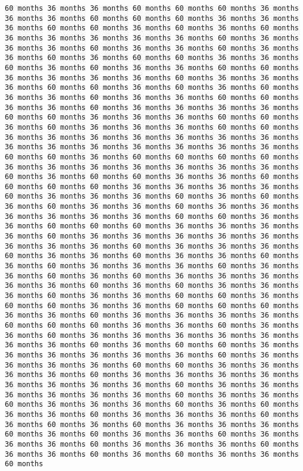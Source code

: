 \documentclass[11pt]{article}
\begin{document}
\begin{Verbatim}[commandchars=\\\{\}, frame=single, framerule=2mm, rulecolor=\color{outerrorbackground}]
60 months 36 months 36 months 60 months 60 months 60 months 36 months 36 months 36 months 60 months 60 months 60 months 36 months 36 months 36 months 60 months 60 months 36 months 60 months 36 months 60 months 36 months 36 months 36 months 36 months 36 months 60 months 36 months 36 months 36 months 60 months 36 months 36 months 60 months 36 months 36 months 60 months 36 months 60 months 60 months 36 months 36 months 60 months 36 months 60 months 36 months 36 months 60 months 60 months 36 months 36 months 36 months 36 months 60 months 36 months 36 months 36 months 60 months 60 months 36 months 60 months 36 months 60 months 36 months 36 months 60 months 36 months 36 months 60 months 60 months 36 months 36 months 60 months 36 months 36 months 36 months 36 months 60 months 60 months 36 months 36 months 36 months 60 months 60 months 36 months 60 months 36 months 36 months 36 months 60 months 60 months 36 months 36 months 36 months 36 months 36 months 36 months 36 months 36 months 36 months 36 months 36 months 36 months 36 months 36 months 60 months 60 months 36 months 60 months 60 months 60 months 60 months 36 months 36 months 36 months 36 months 36 months 36 months 36 months 60 months 36 months 60 months 60 months 36 months 36 months 60 months 60 months 60 months 60 months 36 months 36 months 36 months 36 months 60 months 36 months 36 months 36 months 60 months 36 months 60 months 36 months 60 months 36 months 36 months 60 months 36 months 36 months 36 months 36 months 36 months 36 months 60 months 60 months 36 months 36 months 60 months 60 months 60 months 36 months 36 months 36 months 36 months 60 months 36 months 36 months 36 months 36 months 36 months 36 months 36 months 36 months 60 months 36 months 36 months 36 months 60 months 36 months 36 months 60 months 36 months 36 months 60 months 36 months 60 months 36 months 36 months 36 months 60 months 36 months 36 months 60 months 36 months 60 months 36 months 36 months 36 months 36 months 36 months 60 months 36 months 60 months 36 months 36 months 36 months 60 months 36 months 36 months 60 months 60 months 36 months 60 months 60 months 36 months 36 months 60 months 60 months 60 months 36 months 36 months 60 months 36 months 36 months 36 months 36 months 60 months 60 months 60 months 36 months 36 months 60 months 36 months 36 months 60 months 36 months 36 months 36 months 36 months 36 months 36 months 36 months 60 months 36 months 60 months 60 months 36 months 36 months 36 months 36 months 36 months 36 months 60 months 36 months 36 months 36 months 36 months 60 months 60 months 36 months 36 months 36 months 36 months 60 months 36 months 36 months 36 months 36 months 36 months 36 months 36 months 36 months 60 months 36 months 36 months 36 months 36 months 36 months 36 months 60 months 36 months 36 months 60 months 36 months 36 months 36 months 60 months 36 months 60 months 36 months 36 months 60 months 36 months 36 months 36 months 60 months 36 months 60 months 36 months 60 months 36 months 36 months 36 months 60 months 36 months 60 months 36 months 36 months 60 months 36 months 36 months 36 months 60 months 36 months 36 months 36 months 60 months 36 months 36 months 60 months 36 months 60 months 36 months 36 months 60 months 
\end{Verbatim}
\end{document}

